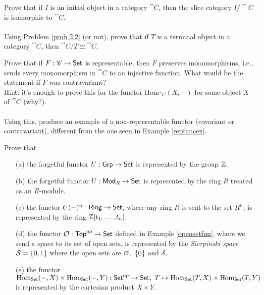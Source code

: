 \vspace{0.1in}

\begin{problem}\label{prob 4.2b}
Prove that if $I$ is an initial object in a category $\cat{C}$, then the slice category $I/\cat{C}$ is isomorphic to $\cat{C}$.\\
\\
Using Problem \ref{prob 2.2} (or not), prove that if $T$ is a terminal object in a category $\cat{C}$, then $\cat{C}/T \cong \cat{C}$.
\end{problem}

\vspace{0.1in}

\begin{problem}\label{prob 4.3}
Prove that if $F : \mathscr{C} \to \mathsf{Set}$ is representable, then $F$ preserves monomorphisms, i.e., sends every monomorphism in $\cat{C}$ to an injective function. What would be the statement if $F$ was contravariant?\\[0.5em]
{\footnotesize Hint: it's enough to prove this for the functor $\mathrm{Hom}_{\cat{C}}(X,-)$ for some object $X$ of $\cat{C}$ (why?).}\\
\\
Using this, produce an example of a non-representable functor (covariant or contravariant), different from the one seen in Example \ref{repfuncex}.
\end{problem}

\vspace{0.1in}

\begin{problem}\label{prob 4.4}
Prove that
\begin{itemize}
\item[(a)] the forgetful functor $U:\mathsf{Grp} \to \mathsf{Set}$ is represented by the group $\mathbb Z$.
\item[(b)] the forgetful functor $U:\mathsf{Mod}_R \to \mathsf{Set}$ is represented by the ring $R$ treated as an $R$-module.
\item[(c)] the functor $U(-)^n:\mathsf{Ring} \to \mathsf{Set}$, where any ring $R$ is sent to the set $R^n$, is represented by the ring $\mathbb Z[t_1,\ldots,t_n]$.
\item[(d)] the functor $\mathcal{O}:\mathsf{Top}^{\text{op}} \to \mathsf{Set}$ defined in Example \ref{opensetfun}, where we send a space to its set of open sets, is represented by the \emph{Sierpinski space} $\mathcal{S} = \left\{0,1\right\}$ where the open sets are $\varnothing,\ \left\{0\right\}$ and $\mathcal{S}$.
\item[(e)] the functor $\mathrm{Hom}_{\mathsf{Set}}(-,X) \times \mathrm{Hom}_{\mathsf{Set}}(-,Y):\mathsf{Set}^{\text{op}} \to \mathsf{Set},\ T \mapsto \mathrm{Hom}_{\mathsf{Set}}(T,X) \times \mathrm{Hom}_{\mathsf{Set}}(T,Y)$ is represented by the cartesian product $X \times Y$.
\end{itemize}
\end{problem}

